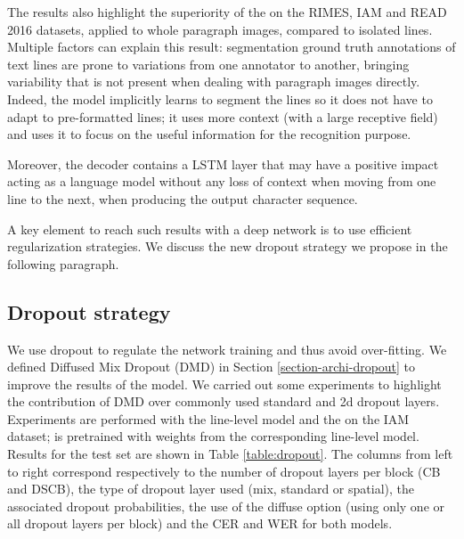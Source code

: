 The results also highlight the superiority of the \modelname{} on the RIMES, IAM and READ 2016 datasets, applied to whole paragraph images, compared to isolated lines. Multiple factors can explain this result: segmentation ground truth annotations of text lines are prone to variations from one annotator to another, bringing variability that is not present when dealing with paragraph images directly. Indeed, the model implicitly learns to segment the lines so it does not have to adapt to pre-formatted lines; it uses more context (with a large receptive field) and uses it to focus on the useful information for the recognition purpose. 

Moreover, the \modelacc{} decoder contains a LSTM layer that may have a positive impact acting as a language model without any loss of context when moving from one line to the next, when producing the output character sequence.

A key element to reach such results with a deep network is to use efficient regularization strategies. We discuss the new dropout strategy we propose in the following paragraph.

\subsection{Dropout strategy}
We use dropout to regulate the network training and thus avoid over-fitting. We defined Diffused Mix Dropout (DMD) in Section \ref{section-archi-dropout} to improve the results of the model. We carried out some experiments to highlight the contribution of DMD over commonly used standard and 2d dropout layers. Experiments are performed with the line-level model and the \modelacc{} on the IAM dataset; \modelacc{} is pretrained with weights from the corresponding line-level model. Results for the test set are shown in Table \ref{table:dropout}. The columns from left to right correspond respectively to the number of dropout layers per block (CB and DSCB), the type of dropout layer used (mix, standard or spatial), the associated dropout probabilities, the use of the diffuse option (using only one or all dropout layers per block) and the CER and WER for both models.

